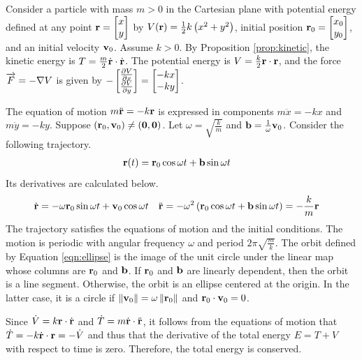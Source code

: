 \begin{answer}
	Consider a particle with mass $m>0$ in the Cartesian plane with potential energy defined at any point $\mathbf{r} = \begin{bmatrix} x \\ y \end{bmatrix}$ by $V\!\left(\mathbf{r}\right) = \frac{1}{2} k \left(x^2+y^2\right)$, initial position $\mathbf{r}_0 =
		\begin{bmatrix}
			x_0 \\
			y_0
		\end{bmatrix}$, and an initial velocity $\mathbf{v}_0$.
	Assume $k > 0$.
	By Proposition \ref{prop:kinetic}, the kinetic energy is $T = \frac{m}{2} \dot{\mathbf{r}} \cdot \dot{\mathbf{r}}$.
	The potential energy is $V = \frac{k}{2} \mathbf{r} \cdot \mathbf{r}$, and the force $\overrightarrow{F} = - \nabla V$ is given by $\displaystyle - \begin{bmatrix} \tfrac{\partial V}{\partial x} \\ \tfrac{\partial V}{\partial y} \end{bmatrix} = \begin{bmatrix} -kx \\ -ky \end{bmatrix}$.

	The equation of motion $m \ddot{\mathbf{r}} = - k \mathbf{r}$ is expressed in components $m \ddot{x} = -kx$ and $m \ddot{y} = -ky$.
	Suppose $\left(\mathbf{r}_0, \mathbf{v}_0\right) \neq \left(\mathbf{0}, \mathbf{0}\right)$.
	Let $\omega = \sqrt{\frac{k}{m}}$ and $\mathbf{b} = \frac{1}{\omega} \mathbf{v}_0$.
	Consider the following trajectory.
	\begin{align}\label{eqn:ellipse}
		\mathbf{r}(t) & = \mathbf{r}_0 \cos \omega t + \mathbf{b} \sin \omega t
	\end{align}
	Its derivatives are calculated below.
	\begin{align*}
		\dot{\mathbf{r}}
		 & = - \omega \mathbf{r}_0 \sin \omega t + \mathbf{v}_0 \cos \omega t
		 &
		\ddot{\mathbf{r}}
		 & = - \omega^2 \left(\mathbf{r}_0 \cos \omega t + \mathbf{b} \sin \omega t\right)
		= - \frac{k}{m} \mathbf{r}
	\end{align*}
	The trajectory satisfies the equations of motion and the initial conditions.
	The motion is periodic with angular frequency $\omega$ and period $2 \pi \sqrt{\frac{m}{k}}$.
	The orbit defined by Equation \eqref{eqn:ellipse} is the image of the unit circle under the linear map whose columns are $\mathbf{r}_0$ and $\mathbf{b}$.
	If $\mathbf{r}_0$ and $\mathbf{b}$ are linearly dependent, then the orbit is a line segment.
	Otherwise, the orbit is an ellipse centered at the origin.
	In the latter case, it is a circle if $\left\|\mathbf{v}_0\right\| = \omega \left\|\mathbf{r}_0\right\|$ and $\mathbf{r}_0 \cdot \mathbf{v}_0 = 0$.

	Since $\dot{V} = k \mathbf{r} \cdot \dot{\mathbf{r}}$ and $\dot{T} = m \dot{\mathbf{r}} \cdot \ddot{\mathbf{r}}$, it follows from the equations of motion that $\dot{T} = -k \dot{\mathbf{r}} \cdot \mathbf{r} = - \dot{V}$ and thus that the derivative of the total energy $E = T + V$ with respect to time is zero.
	Therefore, the total energy is conserved.
\end{answer}

